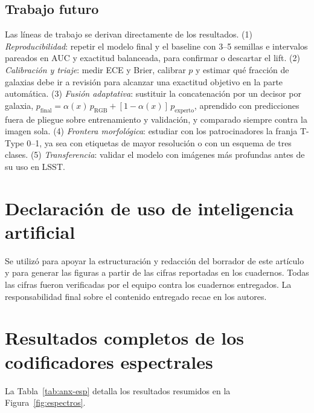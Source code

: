 \documentclass[letterpaper,11pt]{article}
\begin{document}
\subsection{Trabajo futuro}
Las líneas de trabajo se derivan directamente de los resultados. (1) \emph{Reproducibilidad}: repetir el modelo final y el baseline con 3--5 semillas e intervalos pareados en AUC y exactitud balanceada, para confirmar o descartar el lift. (2) \emph{Calibración y triaje}: medir ECE y Brier, calibrar $p$ y estimar qué fracción de galaxias debe ir a revisión para alcanzar una exactitud objetivo en la parte automática. (3) \emph{Fusión adaptativa}: sustituir la concatenación por un decisor por galaxia, $p_{\text{final}} = \alpha(x)\,p_{\text{RGB}} + [1-\alpha(x)]\,p_{\text{experto}}$, aprendido con predicciones fuera de pliegue sobre entrenamiento y validación, y comparado siempre contra la imagen sola. (4) \emph{Frontera morfológica}: estudiar con los patrocinadores la franja T-Type 0--1, ya sea con etiquetas de mayor resolución o con un esquema de tres clases. (5) \emph{Transferencia}: validar el modelo con imágenes más profundas antes de su uso en LSST.

\section*{Declaración de uso de inteligencia artificial}
Se utilizó \textcite{microsoft2026copilot} para apoyar la estructuración y redacción del borrador de este artículo y para generar las figuras a partir de las cifras reportadas en los cuadernos. Todas las cifras fueron verificadas por el equipo contra los cuadernos entregados. La responsabilidad final sobre el contenido entregado recae en los autores.

\printbibliography[title={Referencias}]

\clearpage
\appendix
\section{Resultados completos de los codificadores espectrales}
\label{anx:espectros}
La Tabla~\ref{tab:anx-esp} detalla los resultados resumidos en la Figura~\ref{fig:espectros}.
\end{document}
